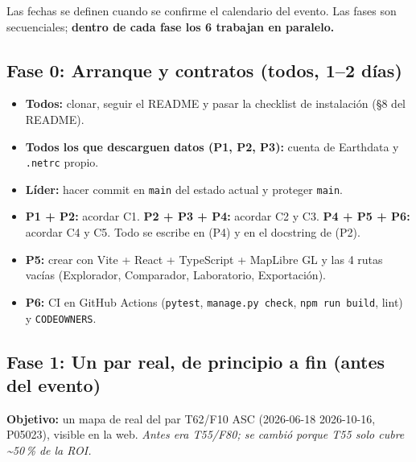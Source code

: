 \documentclass[11pt,a4paper]{article}
\begin{document}
Las fechas se definen cuando se confirme el calendario del evento. Las fases son secuenciales; \textbf{dentro de cada fase los 6
trabajan en paralelo.}

\subsection{Fase 0: Arranque y contratos (todos, 1--2 días)}

\begin{itemize}[label=$\square$]
  \item \textbf{Todos:} clonar, seguir el README y pasar la checklist de instalación (§8 del README).
  \item \textbf{Todos los que descarguen datos (P1, P2, P3):} cuenta de Earthdata y \texttt{.netrc} propio.
  \item \textbf{Líder:} hacer commit en \texttt{main} del estado actual y proteger \texttt{main}.
  \item \textbf{P1 + P2:} acordar C1. \textbf{P2 + P3 + P4:} acordar C2 y C3. \textbf{P4 + P5 + P6:} acordar C4 y C5. Todo se escribe
        en  (P4) y en el docstring de  (P2).
  \item \textbf{P5:} crear  con Vite + React + TypeScript + MapLibre GL y las 4 rutas vacías (Explorador, Comparador,
        Laboratorio, Exportación).
  \item \textbf{P6:} CI en GitHub Actions (\texttt{pytest}, \texttt{manage.py check}, \texttt{npm run build}, lint) y \texttt{CODEOWNERS}.
\end{itemize}

\subsection{Fase 1: Un par real, de principio a fin (antes del evento)}

\textbf{Objetivo:} un mapa de \dsz{} real del par T62/F10 ASC (2026-06-18 \flecha{} 2026-10-16, P05023), visible en la web.
\emph{Antes era T55/F80; se cambió porque T55 solo cubre \textasciitilde 50\,\% de la ROI.}
\end{document}
